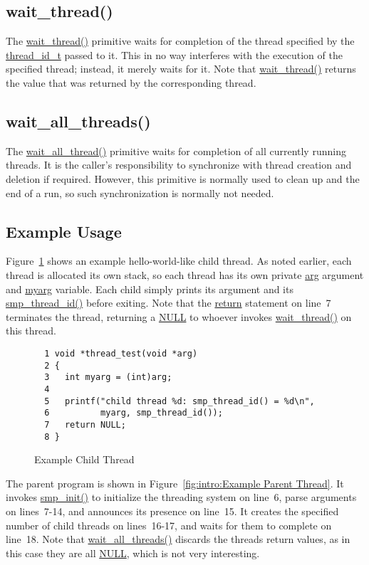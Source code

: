 \subsection{wait\_thread()}

The \url{wait_thread()} primitive waits for completion of the thread
specified by the \url{thread_id_t} passed to it.
This in no way interferes with the execution of the specified thread;
instead, it merely waits for it.
Note that \url{wait_thread()} returns the value that was returned by
the corresponding thread.

\subsection{wait\_all\_threads()}

The \url{wait_all_thread()}
primitive waits for completion of all currently running threads.
It is the caller's responsibility to synchronize with thread creation
and deletion if required.
However, this primitive is normally used to clean up and the end of
a run, so such synchronization is normally not needed.

\subsection{Example Usage}

Figure~\ref{fig:intro:Example Child Thread}
shows an example hello-world-like child thread.
As noted earlier, each thread is allocated its own stack, so
each thread has its own private \url{arg} argument and \url{myarg} variable.
Each child simply prints its argument and its \url{smp_thread_id()}
before exiting.
Note that the \url{return} statement on line~7 terminates the thread,
returning a \url{NULL} to whoever invokes \url{wait_thread()} on this
thread.

\begin{figure}[htbp]
{ \scriptsize
\begin{verbatim}
  1 void *thread_test(void *arg)
  2 {
  3   int myarg = (int)arg;
  4
  5   printf("child thread %d: smp_thread_id() = %d\n",
  6          myarg, smp_thread_id());
  7   return NULL;
  8 }
\end{verbatim}
}
\caption{Example Child Thread}
\label{fig:intro:Example Child Thread}
\end{figure}

The parent program is shown in
Figure~\ref{fig:intro:Example Parent Thread}.
It invokes \url{smp_init()} to initialize the threading system on
line~6,
parse arguments on lines~7-14, and announces its presence on line~15.
It creates the specified number of child threads on lines~16-17,
and waits for them to complete on line~18.
Note that \url{wait_all_threads()} discards the threads return values,
as in this case they are all \url{NULL}, which is not very interesting.

